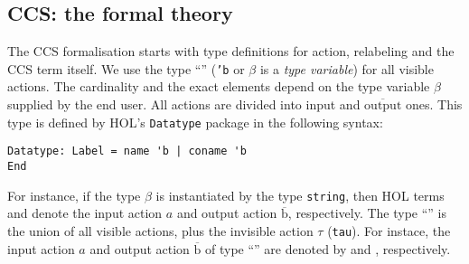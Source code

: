 
\subsection{CCS: the formal theory}
\label{ss:formalCCS}

The CCS formalisation starts with type definitions for action,
relabeling and the CCS term itself. We use the type ``'' (\texttt{'b} or
$\beta$ is a \emph{type variable}) for all visible actions. The
cardinality and the exact elements depend on the type variable $\beta$
supplied by the end user.
All actions are divided into input and $\overline{\text{output}}$ ones.
This type is defined by HOL's \texttt{Datatype} package in the
following syntax:
\begin{lstlisting}
Datatype: Label = name 'b | coname 'b
End
\end{lstlisting}
For instance, if the type $\beta$ is instantiated by the type
\texttt{string}, then HOL terms  and
 denote the input action $a$ and output
action $\overline{\text{b}}$, respectively.
The type ``'' is the
union of all visible actions, plus the invisible action $\tau$
(\texttt{tau}). For instace, the input action $a$ and output
action $\overline{\text{b}}$ of type ``''
are denoted by  and , respectively.

